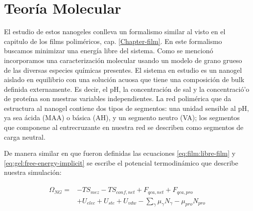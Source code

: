 \section{Teor\'ia Molecular}

El estudio de estos nanogeles conlleva un formalismo similar al visto en el capitulo de los films polim\'ericos, cap. \ref{Chapter-film}.
En este formalismo  buscamos minimizar una energ\'ia libre del sistema. Como se mencion\'o 
incorporamos una caracterizaci\'on molecular usando un modelo de grano grueso de las diversas especies qu\'imicas presentes.
El sistema en estudio es un nanogel aislado en equilibrio con una soluci\'on acuosa que tiene una composici\'on de bulk definida externamente.
Es decir, el pH, la concentraci\'on de sal y la concentració'o de prote\'ina son nuestras variables independientes.
La red polim\'erica que da estructura al nanogel contiene dos tipos de segmentos: una unidad sensible al pH, ya sea \'acida (MAA) o b\'asica (AH), y un segmento neutro (VA);
los segmentos que componene al entrecruzante en nuestra red se describen como segmentos de carga neutral.

De manera similar en que fueron definidas las ecuaciones \ref{eq:film:libre-film} y \ref{eq:gel:free-energy-implicit} se escribe el potencial termodin\'amico que describe nuestra simulaci\'on:

\begin{align}
\begin{aligned}
\Omega_{NG}=& -TS_{mez} -TS_{conf,net} + F_{qca,net} + F_{qca,pro}\\
& + U_{elec} + U_{ste} + U_{vdw} - \sum_{\gamma}{\mu_\gamma N_\gamma} - \mu_{pro} N_{pro}
\end{aligned}
\label{eq:esf:semicano}
\end{align}


